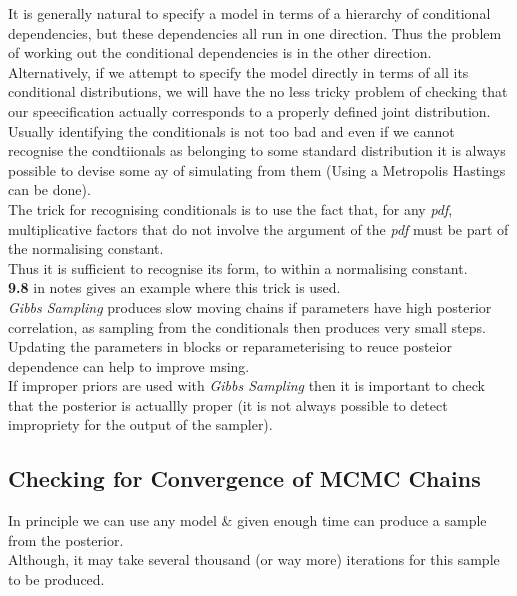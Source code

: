 \documentclass[11pt,a4paper]{article}
\begin{document}
It is generally natural to specify a model in terms of a hierarchy of conditional dependencies, but these dependencies all run in one direction. Thus the problem of working out the conditional dependencies is in the other direction.\\
Alternatively, if we attempt to specify the model directly in terms of all its conditional distributions, we will have the no less tricky problem of checking that our speecification actually corresponds to a properly defined joint distribution.\\
\nb Usually identifying the conditionals is not too bad and even if we cannot recognise the condtiionals as belonging to some standard distribution it is always possible to devise some ay of simulating from them (Using a Metropolis Hastings can be done).\\

The trick for recognising conditionals is to use the fact that, for any \textit{pdf}, multiplicative factors that do not involve the argument of the \textit{pdf} must be part of the normalising constant.\\
Thus it is sufficient to recognise its form, to within a normalising constant.\\
\nb \textbf{9.8} in notes gives an example where this trick is used.\\

\textit{Gibbs Sampling} produces slow moving chains if parameters have high posterior correlation, as sampling from the conditionals then produces very small steps.\\
Updating the parameters in blocks or reparameterising to reuce posteior dependence can help to improve msing.\\
If improper priors are used with \textit{Gibbs Sampling} then it is important to check that the posterior is actuallly proper (it is not always possible to detect impropriety for the output of the sampler).

\subsection{Checking for Convergence of MCMC Chains}

In principle we can use any model \& given enough time can produce a sample from the posterior.\\
Although, it may take several thousand (or way more) iterations for this sample to be produced.\\
\end{document}
